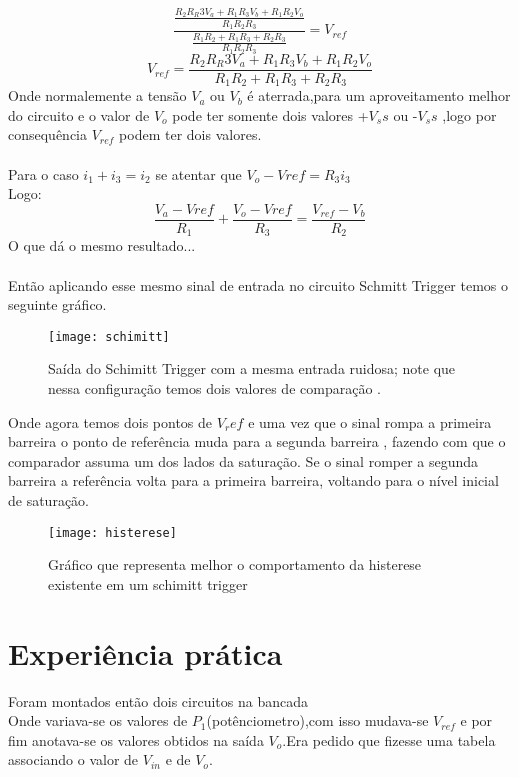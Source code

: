 \documentclass[11pt]{article}
\begin{document}
$$
\frac{\frac{R_2R_R3V_a + R_1R_3V_b +R_1R_2V_o}{R_1R_2R_3}}{\frac{R_1R_2+R_1R_3+R_2R_3}{R_1R_2R_3}}
=V_{ref}
$$
$$V_{ref}=\frac{R_2R_R3V_a + R_1R_3V_b +R_1R_2V_o}{R_1R_2+R_1R_3+R_2R_3}$$
Onde normalemente a tensão $V_a$ ou $V_b$ é aterrada,para um aproveitamento melhor do circuito e o valor de $V_o$ pode ter somente dois valores +$V_ss$ ou -$V_ss$ ,logo por consequência $V_{ref}$ podem ter dois valores. \\\\
Para o caso $i_1+i_3=i_2$ se atentar que $V_o-V{ref}=R_3i_3$\\
Logo:\\
$$\frac{V_a-V{ref}}{R_1}+\frac{V_o-V{ref}}{R_3}=\frac{V_{ref}-V_b}{R_2}$$
O que dá o mesmo resultado...\\\\
Então aplicando esse mesmo sinal de entrada no circuito Schmitt Trigger temos o seguinte gráfico.
\begin{center}
\begin{figure}[!h]
\texttt{[image: schimitt]}
\caption{Saída do Schimitt Trigger com a mesma entrada ruidosa; note que nessa configuração temos dois valores de comparação .  }
\end{figure}
\end{center}
Onde agora temos dois pontos de $V_ref$ e uma vez que o sinal rompa a primeira barreira o ponto de referência muda para a segunda barreira , fazendo com que o comparador assuma um dos lados da saturação. Se o sinal romper a segunda barreira a referência volta para a primeira barreira, voltando para o nível inicial de saturação. \\

\begin{figure}[!h]
\texttt{[image: histerese]}
\caption{Gráfico que representa melhor o comportamento da histerese existente em um schimitt trigger }
\end{figure}

\section{Experiência prática}
Foram montados então dois circuitos na bancada\\

Onde variava-se os valores de $P_1$(potênciometro),com isso mudava-se $V_{ref}$ e por fim anotava-se os valores obtidos na saída $V_o$.Era pedido que fizesse uma tabela associando o valor de $V_{in}$ e de $V_o$.
\end{document}
